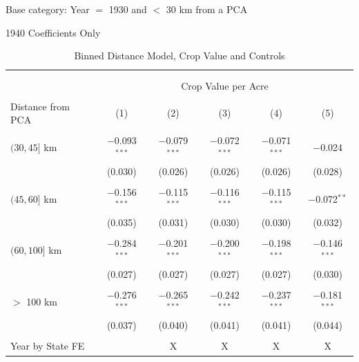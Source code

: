 \documentclass[12pt]{article}
\begin{document}
\begin{table}
    \centering

    \caption{Binned Distance Model, Crop Value and Controls}
\label{crop_val_controls}

\footnotesize   
\vspace{.5cm} 
Base category: Year $=$ 1930 and $<$ 30 km from a PCA

1940 Coefficients Only

\begin{threeparttable}[t]
\begin{tabular}{@{\extracolsep{5pt}}lccccc} 
    \\[-1.8ex]\hline 
    \hline \\[-1.8ex]
    \\[-1.8ex] & \multicolumn{5}{c}{Crop Value per Acre} \\ [.5em]
    \cline{2-6} 
    \\[-1.8ex] Distance from PCA & (1) & (2) & (3) & (4) & (5)\\ 
    \hline \\[-1.8ex] 
    $(30, 45]$ km & $-$0.093$^{***}$ & $-$0.079$^{***}$ & $-$0.072$^{***}$ & $-$0.071$^{***}$ & $-$0.024 \\ 
    & (0.030) & (0.026) & (0.026) & (0.026) & (0.028) \\ 
    & & & & & \\ 
    $(45, 60]$ km & $-$0.156$^{***}$ & $-$0.115$^{***}$ & $-$0.116$^{***}$ & $-$0.115$^{***}$ & $-$0.072$^{**}$ \\ 
    & (0.035) & (0.031) & (0.030) & (0.030) & (0.032) \\ 
    & & & & & \\ 
   $(60, 100]$ km & $-$0.284$^{***}$ & $-$0.201$^{***}$ & $-$0.200$^{***}$ & $-$0.198$^{***}$ & $-$0.146$^{***}$ \\ 
    & (0.027) & (0.027) & (0.027) & (0.027) & (0.030) \\ 
    & & & & & \\ 
   $>$ 100 km & $-$0.276$^{***}$ & $-$0.265$^{***}$ & $-$0.242$^{***}$ & $-$0.237$^{***}$ & $-$0.181$^{***}$ \\ 
    & (0.037) & (0.040) & (0.041) & (0.041) & (0.044) \\ 
    & & & & & \\ 
    Year by State FE &  & X & X & X & X \\ 

\end{tabular}
\end{threeparttable}
\end{table}
\end{document}
